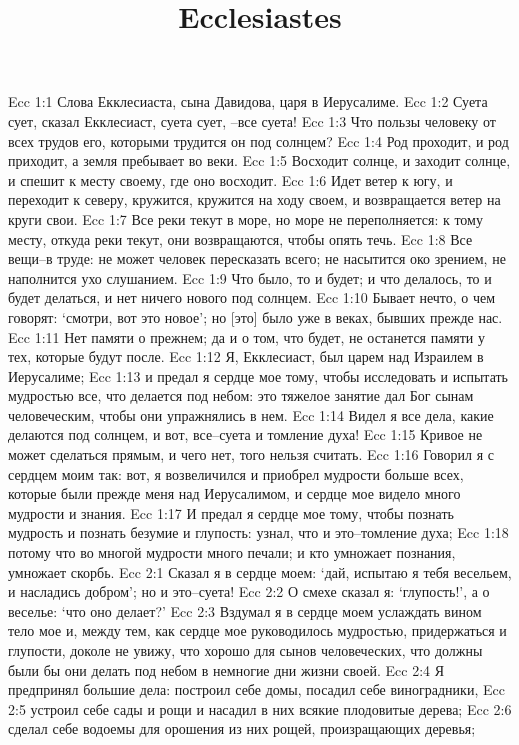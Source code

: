 

\title{Ecclesiastes}

Ecc 1:1  Слова Екклесиаста, сына Давидова, царя в Иерусалиме.
Ecc 1:2  Суета сует, сказал Екклесиаст, суета сует, --все суета!
Ecc 1:3  Что пользы человеку от всех трудов его, которыми трудится он под солнцем?
Ecc 1:4  Род проходит, и род приходит, а земля пребывает во веки.
Ecc 1:5  Восходит солнце, и заходит солнце, и спешит к месту своему, где оно восходит.
Ecc 1:6  Идет ветер к югу, и переходит к северу, кружится, кружится на ходу своем, и возвращается ветер на круги свои.
Ecc 1:7  Все реки текут в море, но море не переполняется: к тому месту, откуда реки текут, они возвращаются, чтобы опять течь.
Ecc 1:8  Все вещи--в труде: не может человек пересказать всего; не насытится око зрением, не наполнится ухо слушанием.
Ecc 1:9  Что было, то и будет; и что делалось, то и будет делаться, и нет ничего нового под солнцем.
Ecc 1:10  Бывает нечто, о чем говорят: `смотри, вот это новое'; но [это] было уже в веках, бывших прежде нас.
Ecc 1:11  Нет памяти о прежнем; да и о том, что будет, не останется памяти у тех, которые будут после.
Ecc 1:12  Я, Екклесиаст, был царем над Израилем в Иерусалиме;
Ecc 1:13  и предал я сердце мое тому, чтобы исследовать и испытать мудростью все, что делается под небом: это тяжелое занятие дал Бог сынам человеческим, чтобы они упражнялись в нем.
Ecc 1:14  Видел я все дела, какие делаются под солнцем, и вот, все--суета и томление духа!
Ecc 1:15  Кривое не может сделаться прямым, и чего нет, того нельзя считать.
Ecc 1:16  Говорил я с сердцем моим так: вот, я возвеличился и приобрел мудрости больше всех, которые были прежде меня над Иерусалимом, и сердце мое видело много мудрости и знания.
Ecc 1:17  И предал я сердце мое тому, чтобы познать мудрость и познать безумие и глупость: узнал, что и это--томление духа;
Ecc 1:18  потому что во многой мудрости много печали; и кто умножает познания, умножает скорбь.
Ecc 2:1  Сказал я в сердце моем: `дай, испытаю я тебя весельем, и насладись добром'; но и это--суета!
Ecc 2:2  О смехе сказал я: `глупость!', а о веселье: `что оно делает?'
Ecc 2:3  Вздумал я в сердце моем услаждать вином тело мое и, между тем, как сердце мое руководилось мудростью, придержаться и глупости, доколе не увижу, что хорошо для сынов человеческих, что должны были бы они делать под небом в немногие дни жизни своей.
Ecc 2:4  Я предпринял большие дела: построил себе домы, посадил себе виноградники,
Ecc 2:5  устроил себе сады и рощи и насадил в них всякие плодовитые дерева;
Ecc 2:6  сделал себе водоемы для орошения из них рощей, произращающих деревья;
